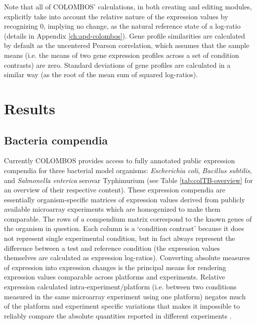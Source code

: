 Note that all of COLOMBOS' calculations, in both creating and editing modules,  explicitly take into account the relative nature of the expression values by  recognizing $0$, implying no change, as the natural reference state of a  log-ratio (details in Appendix \ref{ch:apd-colombos}).  Gene profile similarities are calculated by default as the uncentered Pearson  correlation, which assumes that the sample means (i.e. the means of two gene  expression profiles across a set of condition contrasts) are zero. Standard  deviations of gene profiles are calculated in a similar way (as the root of the  mean sum of squared log-ratios).



\section{Results}

\subsection{Bacteria compendia}\label{sec:colombos-comp}

Currently COLOMBOS provides access to fully annotated public expression  compendia for three bacterial model organisms: {\it Escherichia coli}, {\it  Bacillus subtilis}, and {\it Salmonella enterica} serovar Typhimurium (see  Table \ref{tab:colTB-overview} for an overview of their respective  content).  These expression compendia are essentially organism-specific matrices of  expression values derived from publicly available microarray experiments which  are homogenized to make them comparable. The rows of a compendium matrix  correspond to the known genes of the organism in question. Each column is a  `condition contrast' because it does not represent single experimental  condition, but in fact always represent the difference between a  test and reference condition (the expression values themselves are calculated  as expression log-ratios).  Converting absolute measures of expression into  expression changes is the principal means for rendering expression values  comparable across platforms and experiments. Relative expression calculated  intra-experiment/platform (i.e. between two conditions measured in the same  microarray experiment using one platform) negates much of the platform and  experiment specific variations that makes it impossible to reliably compare the  absolute quantities reported in different experiments \cite{Shi2006}.

